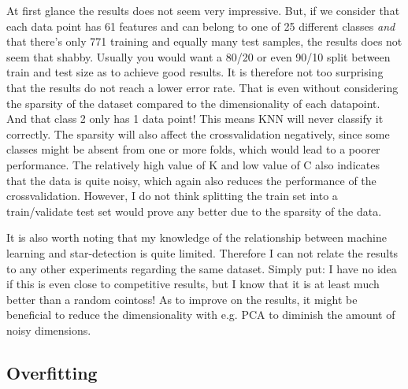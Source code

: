 \documentclass{article}
\theoremstyle{plain}
\theoremstyle{nonumberplain}
\begin{document}
At first glance the results does not seem very impressive.
But, if we consider that each data point has 61 features and can belong to one of 25 different classes \textit{and} that there's only 771 training and equally many test samples, the results does not seem that shabby. 
Usually you would want a 80/20 or even 90/10 split between train and test size as to achieve good results.
It is therefore not too surprising that the results do not reach a lower error rate.
That is even without considering the sparsity of the dataset compared to the dimensionality of each datapoint.
And that class 2 only has 1 data point! This means KNN will never classify it correctly. 
The sparsity will also affect the crossvalidation negatively, since some classes might be absent from one or more folds, which would lead to a poorer performance. 
The relatively high value of K and low value of C also indicates that the data is quite noisy, which again also reduces the performance of the crossvalidation.
However, I do not think splitting the train set into a train/validate test set would prove any better due to the sparsity of the data.

It is also worth noting that my knowledge of the relationship between machine learning and star-detection is quite limited.
Therefore I can not relate the results to any other experiments regarding the same dataset. 
Simply put: I have no idea if this is even close to competitive results, but I know that it is at least much better than a random cointoss! 
As to improve on the results, it might be beneficial to reduce the dimensionality with e.g. PCA to diminish the amount of noisy dimensions.

\subsection{Overfitting}






\end{document}
